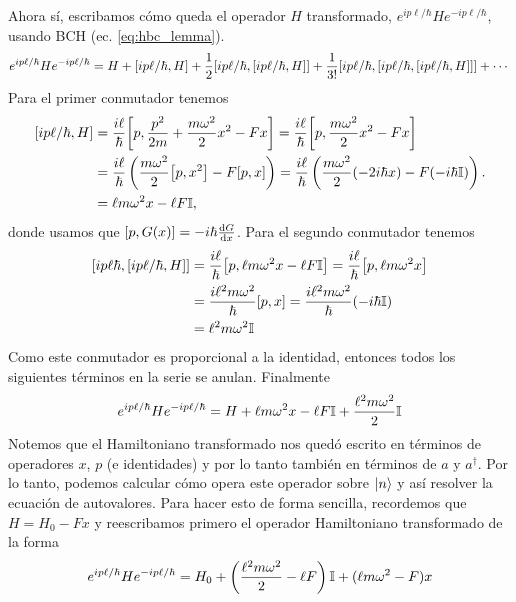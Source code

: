 \documentclass[10pt, a4paper]{article}
\numberwithin{equation}{subsection}
\begin{document}
Ahora sí, escribamos cómo queda el operador $H$ transformado,
$e^{ip\ell/\hbar}He^{-ip\ell/\hbar}$, usando BCH (ec. \eqref{eq:hbc_lemma}).
\begin{equation}
  e^{ip\ell/\hbar}He^{-ip\ell/\hbar} = H + \comm{ip\ell/\hbar}{H} +
  \frac{1}{2}\comm{ip\ell/\hbar}{\comm{ip\ell/\hbar}{H}} +
  \frac{1}{3!}\comm{ip\ell/\hbar}{\comm{ip\ell/\hbar}{\comm{ip\ell/\hbar}{H}}}
  + \cdots
\end{equation}
Para el primer conmutador tenemos
\begin{align}
  \comm{ip\ell/\hbar}{H} &= \frac{i\ell}{\hbar}\comm{p}{\frac{p^2}{2m} +
    \frac{m\omega^2}{2}x^2 - Fx} =
    \frac{i\ell}{\hbar}\comm{p}{\frac{m\omega^2}{2}x^2 - Fx} \\
  &= \frac{i\ell}{\hbar}\left(\frac{m\omega^2}{2}\comm{p}{x^2} -
    F\comm{p}{x}\right) = \frac{i\ell}{\hbar}\left(\frac{m\omega^2}{2}
    (-2i\hbar x) - F(-i\hbar\Id)\right). \\
  &= \ell m\omega^2x -\ell F\Id,
\end{align}
donde usamos que $\comm{p}{G(x)} = -i\hbar\dv{G}{x}$.
Para el segundo conmutador tenemos
\begin{align}
  \comm{ip\ell\hbar}{\comm{ip\ell/\hbar}{H}}
  &= \frac{i\ell}{\hbar}\comm{p}{\ell m\omega^2x - \ell F\Id} =
    \frac{i\ell}{\hbar}\comm{p}{\ell m\omega^2x} \\
  &= \frac{i\ell^2m\omega^2}{\hbar}\comm{p}{x}
    = \frac{i\ell^2m\omega^2}{\hbar}(-i\hbar\Id) \\
  &= \ell^2m\omega^2\Id
\end{align}
Como este conmutador es proporcional a la identidad, entonces todos los
siguientes términos en la serie se anulan. Finalmente
\begin{equation}
  e^{ip\ell/\hbar}He^{-ip\ell/\hbar} = H + \ell m\omega^2x -\ell F\mathbb{I} +
  \frac{\ell^2m\omega^2}{2}\mathbb{I}
\end{equation}
Notemos que el Hamiltoniano transformado nos quedó escrito en términos de
operadores $x$, $p$ (e identidades) y por lo tanto también en términos de $a$ y
$a^\dagger$. Por lo tanto, podemos calcular cómo opera este operador sobre
$\ket{n}$ y así resolver la ecuación de autovalores. Para hacer esto de forma
sencilla, recordemos que $H = H_0 - Fx$ y reescribamos primero el operador
Hamiltoniano transformado de la forma
\begin{equation}
  e^{ip\ell/\hbar}He^{-ip\ell/\hbar} = H_0 + \left(\frac{\ell^2m\omega^2}{2} -
  \ell F\right)\mathbb{I} + (\ell m\omega^2 - F)x
\end{equation}
\end{document}
